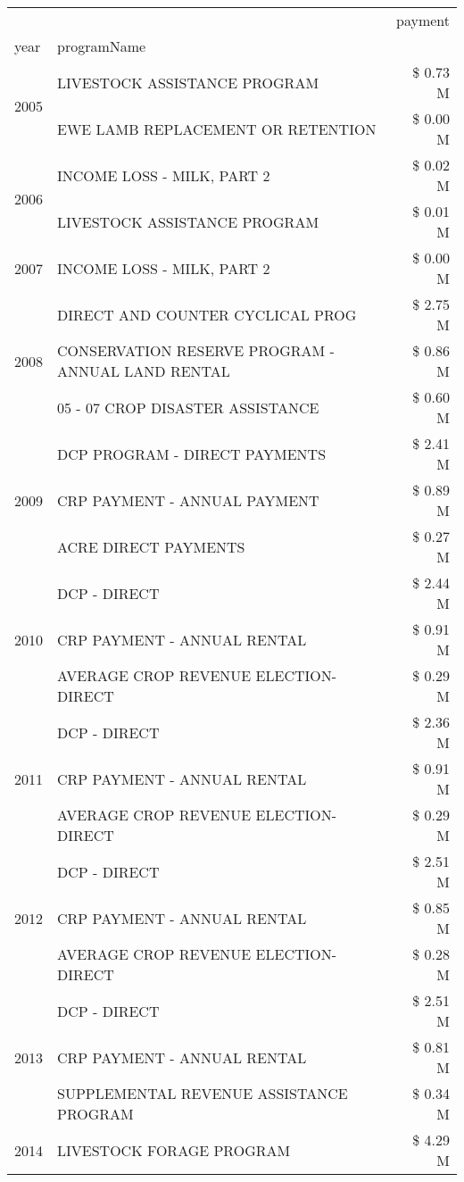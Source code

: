 \begin{tabular}{llr}
\toprule
 &  & payment \\
year & programName &  \\
\midrule
\multirow[t]{2}{*}{2005} & LIVESTOCK ASSISTANCE PROGRAM & \$ 0.73 M \\
 & EWE LAMB REPLACEMENT OR RETENTION & \$ 0.00 M \\
\cline{1-3}
\multirow[t]{2}{*}{2006} & INCOME LOSS - MILK, PART 2 & \$ 0.02 M \\
 & LIVESTOCK ASSISTANCE PROGRAM & \$ 0.01 M \\
\cline{1-3}
2007 & INCOME LOSS - MILK, PART 2 & \$ 0.00 M \\
\cline{1-3}
\multirow[t]{3}{*}{2008} & DIRECT AND COUNTER CYCLICAL PROG & \$ 2.75 M \\
 & CONSERVATION RESERVE PROGRAM - ANNUAL LAND RENTAL & \$ 0.86 M \\
 & 05 - 07 CROP DISASTER ASSISTANCE & \$ 0.60 M \\
\cline{1-3}
\multirow[t]{3}{*}{2009} & DCP PROGRAM - DIRECT PAYMENTS & \$ 2.41 M \\
 & CRP PAYMENT - ANNUAL PAYMENT & \$ 0.89 M \\
 & ACRE DIRECT PAYMENTS & \$ 0.27 M \\
\cline{1-3}
\multirow[t]{3}{*}{2010} & DCP - DIRECT & \$ 2.44 M \\
 & CRP PAYMENT - ANNUAL RENTAL & \$ 0.91 M \\
 & AVERAGE CROP REVENUE ELECTION-DIRECT & \$ 0.29 M \\
\cline{1-3}
\multirow[t]{3}{*}{2011} & DCP - DIRECT & \$ 2.36 M \\
 & CRP PAYMENT - ANNUAL RENTAL & \$ 0.91 M \\
 & AVERAGE CROP REVENUE ELECTION-DIRECT & \$ 0.29 M \\
\cline{1-3}
\multirow[t]{3}{*}{2012} & DCP - DIRECT & \$ 2.51 M \\
 & CRP PAYMENT - ANNUAL RENTAL & \$ 0.85 M \\
 & AVERAGE CROP REVENUE ELECTION-DIRECT & \$ 0.28 M \\
\cline{1-3}
\multirow[t]{3}{*}{2013} & DCP - DIRECT & \$ 2.51 M \\
 & CRP PAYMENT - ANNUAL RENTAL & \$ 0.81 M \\
 & SUPPLEMENTAL REVENUE ASSISTANCE PROGRAM & \$ 0.34 M \\
\cline{1-3}
\multirow[t]{3}{*}{2014} & LIVESTOCK FORAGE PROGRAM & \$ 4.29 M \\

\end{tabular}
